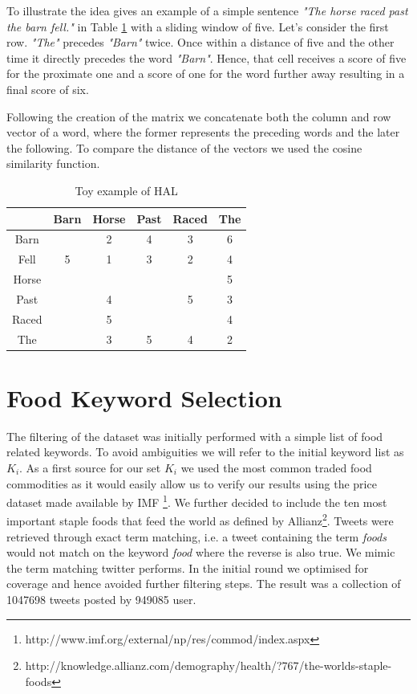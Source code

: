 To illustrate the idea \cite{burgess98} gives an example of a simple sentence \emph {"The horse raced past the barn fell."} in Table \ref{tab:halex} with a sliding window of five. Let's consider the first row.  \emph{"The"} precedes \emph{"Barn"} twice. Once within a distance of five and the other time it directly precedes the word  \emph{"Barn"}. Hence, that cell receives a score of five for the proximate one and a score of one for the word further away resulting in a final score of six. 

Following the creation of the matrix we concatenate both the column and row vector of a word, where the former represents the preceding words and the later the following. To compare the distance of the vectors we used the cosine similarity function. 

 



\begin{table}[h]
\centering
\begin{tabular}{ c c c c c c} \toprule
  & Barn & Horse &  Past & Raced & The \\ 
  \hline
 Barn &  & 2 &  4 & 3 & 6 \\ 
 Fell & 5 & 1 &  3 & 2 & 4 \\ 
 Horse &  &  &   &  & 5 \\ 
 Past &  & 4 &   & 5 & 3 \\ 
 Raced &  & 5 &   &  & 4 \\ 
 The &  & 3 &  5 & 4 & 2 \\ 
   \bottomrule
\end{tabular}
\caption{Toy example of HAL}
\label{tab:halex}
\end{table}






\section{Food Keyword Selection}

The filtering of the dataset was initially performed with a simple list of food related keywords. To avoid ambiguities we will refer to the initial keyword list as $K_i$. As a first source for our set $K_i$ we used the most common traded food commodities as it would easily allow us to verify our results using the price dataset made available by IMF \footnote{http://www.imf.org/external/np/res/commod/index.aspx}. We further decided to include the ten most important staple foods that feed the world as defined by Allianz\footnote{http://knowledge.allianz.com/demography/health/?767/the-worlds-staple-foods}. Tweets were retrieved through exact term matching, i.e. a tweet containing the term \emph{foods} would not match on the keyword \emph {food} where the reverse is also true. We mimic the term matching twitter performs. In the initial round we optimised for coverage and hence avoided further filtering steps. The result was a collection of 1047698 tweets posted by 949085 user. 


